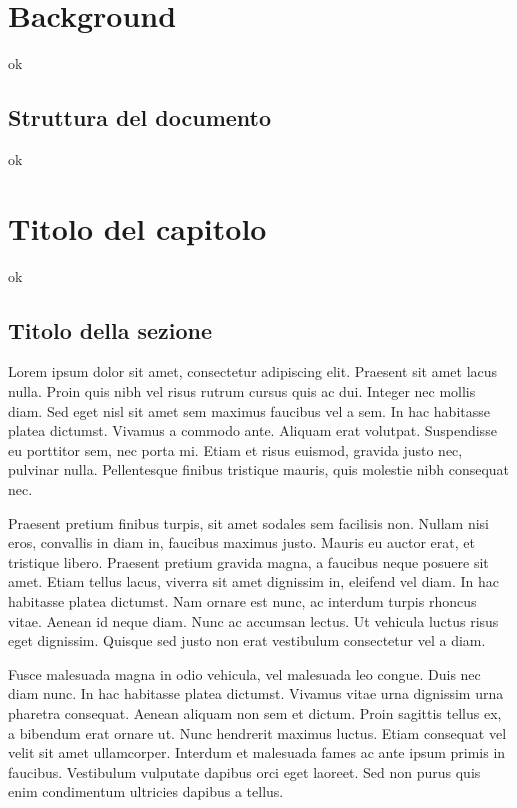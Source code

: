 \documentclass[12pt,a4paper,openright,twoside]{report}
\begin{document}
\clearpage{\pagestyle{empty}\cleardoublepage}
\tableofcontents
{}
\listoffigures
\clearpage{\pagestyle{empty}\cleardoublepage}
\listoftables
\clearpage{\pagestyle{empty}\cleardoublepage}

\clearpage{\pagestyle{empty}\cleardoublepage}
\chapter{Background}
\lhead[\fancyplain{}{\bfseries\thepage}]{\fancyplain{}{\bfseries\rightmark}}


ok
\section{Struttura del documento}
ok

\chapter{Titolo del capitolo}
\lhead[\fancyplain{}{\bfseries\thepage}]{\fancyplain{}{\bfseries\rightmark}}
ok

\section{Titolo della sezione}
\label{chap:physical_memory}
Lorem ipsum dolor sit amet, consectetur adipiscing elit. Praesent sit amet lacus nulla. Proin quis nibh vel risus rutrum cursus quis ac dui. Integer nec mollis diam. Sed eget nisl sit amet sem maximus faucibus vel a sem. In hac habitasse platea dictumst. Vivamus a commodo ante. Aliquam erat volutpat. Suspendisse eu porttitor sem, nec porta mi. Etiam et risus euismod, gravida justo nec, pulvinar nulla. Pellentesque finibus tristique mauris, quis molestie nibh consequat nec.

Praesent pretium finibus turpis, sit amet sodales sem facilisis non. Nullam nisi eros, convallis in diam in, faucibus maximus justo. Mauris eu auctor erat, et tristique libero. Praesent pretium gravida magna, a faucibus neque posuere sit amet. Etiam tellus lacus, viverra sit amet dignissim in, eleifend vel diam. In hac habitasse platea dictumst. Nam ornare est nunc, ac interdum turpis rhoncus vitae. Aenean id neque diam. Nunc ac accumsan lectus. Ut vehicula luctus risus eget dignissim. Quisque sed justo non erat vestibulum consectetur vel a diam.

Fusce malesuada magna in odio vehicula, vel malesuada leo congue. Duis nec diam nunc. In hac habitasse platea dictumst. Vivamus vitae urna dignissim urna pharetra consequat. Aenean aliquam non sem et dictum. Proin sagittis tellus ex, a bibendum erat ornare ut. Nunc hendrerit maximus luctus. Etiam consequat vel velit sit amet ullamcorper. Interdum et malesuada fames ac ante ipsum primis in faucibus. Vestibulum vulputate dapibus orci eget laoreet. Sed non purus quis enim condimentum ultricies dapibus a tellus.
\end{document}
